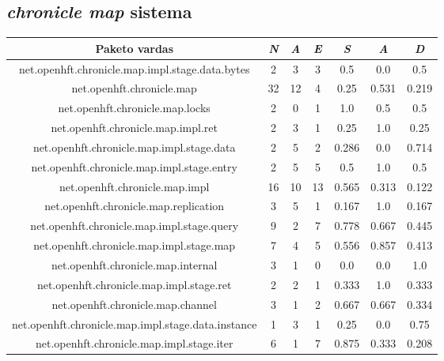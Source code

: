 \subsection{\textit{chronicle map} sistema}
\begin{center}
    \begin{tabular}{|c|c|c|c|c|c|c|}
        \hline
        Paketo vardas & \textit{N} & \textit{A} & \textit{E} & \textit{S} & \textit{A} & \textit{D} \\ [0.5ex]
        \hline\hline
        net.openhft.chronicle.map.impl.stage.data.bytes & 2 & 3 & 3 & 0.5 & 0.0 & 0.5 \\
        \hline
        net.openhft.chronicle.map & 32 & 12 & 4 & 0.25 & 0.531 & 0.219 \\
        \hline
        net.openhft.chronicle.map.locks & 2 & 0 & 1 & 1.0 & 0.5 & 0.5 \\
        \hline
        net.openhft.chronicle.map.impl.ret & 2 & 3 & 1 & 0.25 & 1.0 & 0.25 \\
        \hline
        net.openhft.chronicle.map.impl.stage.data & 2 & 5 & 2 & 0.286 & 0.0 & 0.714 \\
        \hline
        net.openhft.chronicle.map.impl.stage.entry & 2 & 5 & 5 & 0.5 & 1.0 & 0.5 \\
        \hline
        net.openhft.chronicle.map.impl & 16 & 10 & 13 & 0.565 & 0.313 & 0.122 \\
        \hline
        net.openhft.chronicle.map.replication & 3 & 5 & 1 & 0.167 & 1.0 & 0.167 \\
        \hline
        net.openhft.chronicle.map.impl.stage.query & 9 & 2 & 7 & 0.778 & 0.667 & 0.445 \\
        \hline
        net.openhft.chronicle.map.impl.stage.map & 7 & 4 & 5 & 0.556 & 0.857 & 0.413 \\
        \hline
        net.openhft.chronicle.map.internal & 3 & 1 & 0 & 0.0 & 0.0 & 1.0 \\
        \hline
        net.openhft.chronicle.map.impl.stage.ret & 2 & 2 & 1 & 0.333 & 1.0 & 0.333 \\
        \hline
        net.openhft.chronicle.map.channel & 3 & 1 & 2 & 0.667 & 0.667 & 0.334 \\
        \hline
        net.openhft.chronicle.map.impl.stage.data.instance & 1 & 3 & 1 & 0.25 & 0.0 & 0.75 \\
        \hline
        net.openhft.chronicle.map.impl.stage.iter & 6 & 1 & 7 & 0.875 & 0.333 & 0.208 \\
        \hline

\end{tabular}
\end{center}
